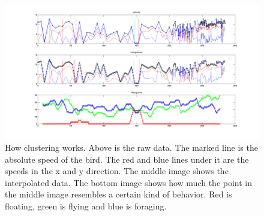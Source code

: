 \begin{figure}
\centering
\includegraphics[width=\textwidth]{clustering.pdf}
\caption{How clustering works. Above is the raw data. The marked line is the
absolute speed of the bird. The red and blue lines under it are the speeds in
the x and y direction.
The middle image shows the interpolated data.
The bottom image shows how much the point in the middle image resembles a
certain kind of behavior. Red is floating, green is flying and blue is foraging.}
\label{fig:clustering}
\end{figure}
